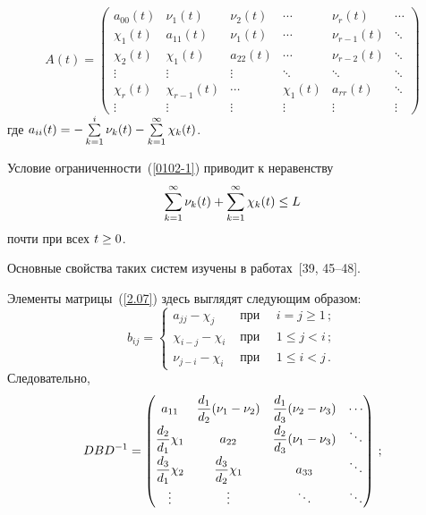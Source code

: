 \begin{multicols}{2}
\noindent
{%
\begin{equation*}
A(t)=\begin{pmatrix}
a_{00}(t) & \nu_1(t)  & \nu_2(t)   &   \cdots & \nu_r(t) & \cdots\\[3pt]
\chi_1(t)   & a_{11}(t)  & \nu_1(t)  &  \cdots & \nu_{r-1}(t) & \ddots\\[3pt]
\chi_2(t)  & \chi_1(t)    & a_{22}(t)&   \cdots & \nu_{r-2}(t) & \ddots\\[3pt]
\vdots&\vdots&\vdots&\ddots&\ddots&\ddots\\[3pt]
\chi_r(t) & \chi_{r-1}(t) & \cdots &  \chi_1 (t)   &  a_{rr}(t) & \ddots\\[3pt]
\vdots&\vdots&\vdots&\vdots&\vdots&\vdots
\end{pmatrix}
\end{equation*}}
где $a_{ii}(t)\hm=-\sum\limits_{k=1}^{i}\nu_k(t) \hm- \sum\limits_{k=1}^{\infty} \chi_{k}(t)$.

Условие ограниченности~(\ref{0102-1}) приводит к неравенству
$$
\sum\limits_{k=1}^{\infty}\nu_k(t)\hm + \sum\limits_{k=1}^{\infty} \chi_{k}(t) \hm \le L
$$
почти при всех $t \hm\ge 0$.

Основные свойства таких систем изучены в  работах~[39, 45--48].

Элементы матрицы~(\ref{2.07}) здесь выглядят сле\-ду\-ющим образом:
\begin{equation*}
b_{ij} = \begin{cases}
 a_{jj}-\chi_j  & \mbox { при } \quad i=j \ge 1\,; \\
\chi_{i-j}-\chi_i  & \mbox { при } \quad 1 \le j < i\,; \\
\nu_{j-i}-\chi_i  & \mbox { при } \quad 1 \le i < j \,.
\end{cases} %
\end{equation*}
Следовательно,
\begin{equation*}
DBD^{-1}=\begin{pmatrix}
a_{11} & \displaystyle\frac{\displaystyle d_{1}\mathstrut}{\displaystyle d_2\mathstrut}(\nu_1-\nu_2) & \displaystyle\frac{\displaystyle d_1\mathstrut}{\displaystyle d_3\mathstrut}(\nu_2-\nu_3) & \cdots  \\
\displaystyle\frac{\displaystyle d_{2}\mathstrut}{\displaystyle d_1\mathstrut}\chi_1 & a_{22} & \displaystyle\frac{\displaystyle d_{2}\mathstrut}{\displaystyle d_3\mathstrut}(\nu_1-\nu_3) &  \ddots \\
\displaystyle\frac{\displaystyle d_{3}\mathstrut}{\displaystyle d_1\mathstrut}\chi_2 & \displaystyle\frac{\displaystyle d_{3}\mathstrut}{\displaystyle d_2\mathstrut}\chi_1 &   a_{33} &  \ddots   \\
\vdots & \vdots & \ddots & \ddots
\end{pmatrix}\,;
\end{equation*}

\vspace*{-12pt}


\end{multicols}
